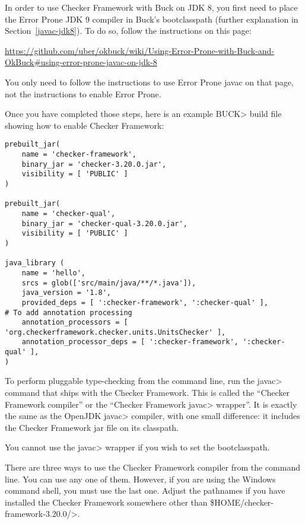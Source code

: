 In order to use Checker Framework with Buck on JDK 8, you first need
to place the Error Prone JDK 9 compiler in Buck's bootclasspath
(further explanation in Section~\ref{javac-jdk8}).  To do so,
follow the instructions on this page:

{\codesize\url{https://github.com/uber/okbuck/wiki/Using-Error-Prone-with-Buck-and-OkBuck#using-error-prone-javac-on-jdk-8}}

You only need to follow the instructions to use Error Prone javac on
that page, not the instructions to enable Error Prone.

Once you have completed those steps, here is an example \<BUCK> build
file showing how to enable Checker Framework:

\begin{Verbatim}
prebuilt_jar(
    name = 'checker-framework',
    binary_jar = 'checker-3.20.0.jar',
    visibility = [ 'PUBLIC' ]
)

prebuilt_jar(
    name = 'checker-qual',
    binary_jar = 'checker-qual-3.20.0.jar',
    visibility = [ 'PUBLIC' ]
)

java_library (
    name = 'hello',
    srcs = glob(['src/main/java/**/*.java']),
    java_version = '1.8',
    provided_deps = [ ':checker-framework', ':checker-qual' ],
# To add annotation processing
    annotation_processors = [ 'org.checkerframework.checker.units.UnitsChecker' ],
    annotation_processor_deps = [ ':checker-framework', ':checker-qual' ],
)
\end{Verbatim}



\label{javac-installation}      %

To perform pluggable type-checking from the command line, run the \<javac>
command that ships with the Checker Framework.  This is called the
``Checker Framework compiler'' or the ``Checker Framework \<javac> wrapper''.
It is exactly the same as the OpenJDK
\<javac> compiler, with one small difference:  it includes the Checker
Framework jar file on its classpath.

You cannot use the \<javac> wrapper if you wish to set the bootclasspath.

There are three ways to use the Checker Framework compiler from the command
line.  You can use any
one of them.  However, if you are using the Windows command shell, you must
use the last one.
Adjust the pathnames if you have installed the Checker Framework somewhere
other than \<\${HOME}/checker-framework-3.20.0/>.


